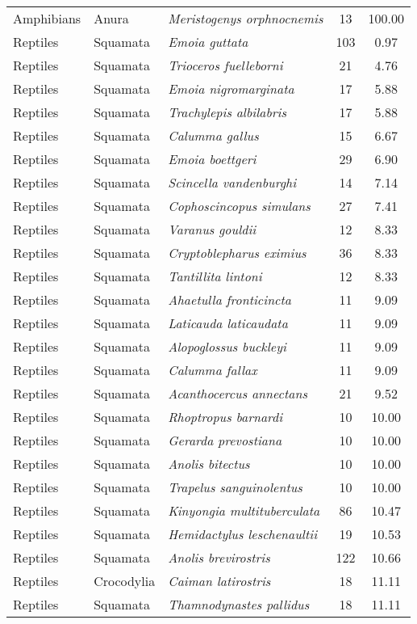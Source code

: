 \begin{longtable}{ll>{\itshape}lcc}
  Amphibians & Anura & Meristogenys orphnocnemis &  13 & 100.00 \\ 
  Reptiles & Squamata & Emoia guttata & 103 & 0.97 \\ 
  Reptiles & Squamata & Trioceros fuelleborni &  21 & 4.76 \\ 
  Reptiles & Squamata & Emoia nigromarginata &  17 & 5.88 \\ 
  Reptiles & Squamata & Trachylepis albilabris &  17 & 5.88 \\ 
  Reptiles & Squamata & Calumma gallus &  15 & 6.67 \\ 
  Reptiles & Squamata & Emoia boettgeri &  29 & 6.90 \\ 
  Reptiles & Squamata & Scincella vandenburghi &  14 & 7.14 \\ 
  Reptiles & Squamata & Cophoscincopus simulans &  27 & 7.41 \\ 
  Reptiles & Squamata & Varanus gouldii &  12 & 8.33 \\ 
  Reptiles & Squamata & Cryptoblepharus eximius &  36 & 8.33 \\ 
  Reptiles & Squamata & Tantillita lintoni &  12 & 8.33 \\ 
  Reptiles & Squamata & Ahaetulla fronticincta &  11 & 9.09 \\ 
  Reptiles & Squamata & Laticauda laticaudata &  11 & 9.09 \\ 
  Reptiles & Squamata & Alopoglossus buckleyi &  11 & 9.09 \\ 
  Reptiles & Squamata & Calumma fallax &  11 & 9.09 \\ 
  Reptiles & Squamata & Acanthocercus annectans &  21 & 9.52 \\ 
  Reptiles & Squamata & Rhoptropus barnardi &  10 & 10.00 \\ 
  Reptiles & Squamata & Gerarda prevostiana &  10 & 10.00 \\ 
  Reptiles & Squamata & Anolis bitectus &  10 & 10.00 \\ 
  Reptiles & Squamata & Trapelus sanguinolentus &  10 & 10.00 \\ 
  Reptiles & Squamata & Kinyongia multituberculata &  86 & 10.47 \\ 
  Reptiles & Squamata & Hemidactylus leschenaultii &  19 & 10.53 \\ 
  Reptiles & Squamata & Anolis brevirostris & 122 & 10.66 \\ 
  Reptiles & Crocodylia & Caiman latirostris &  18 & 11.11 \\ 
  Reptiles & Squamata & Thamnodynastes pallidus &  18 & 11.11 \\ 

\end{longtable}
